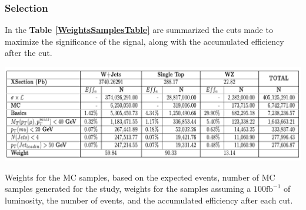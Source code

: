 \documentclass{beamer}
\begin{document}
\begin{frame}
\frametitle{Selection}
\begin{justify}
In the \textbf{Table \ref{WeightsSamplesTable}} are summarized the cuts made to maximize the significance of the signal, along with the accumulated efficiency after the cut.  

\end{justify}

\begin{table}[]
\includegraphics[width=1.0\textwidth]{pictures/Selection/TablaCortes}

\caption{{\scriptsize Weights for the MC samples, based on the expected events, number of MC samples generated for the study, weights for the samples assuming a $100\text{fb}^{-1}$ of luminosity, the number of events, and the accumulated efficiency after each cut.}}
\label{WeightsSamplesTable}
\end{table}

\end{frame}

\end{document}
